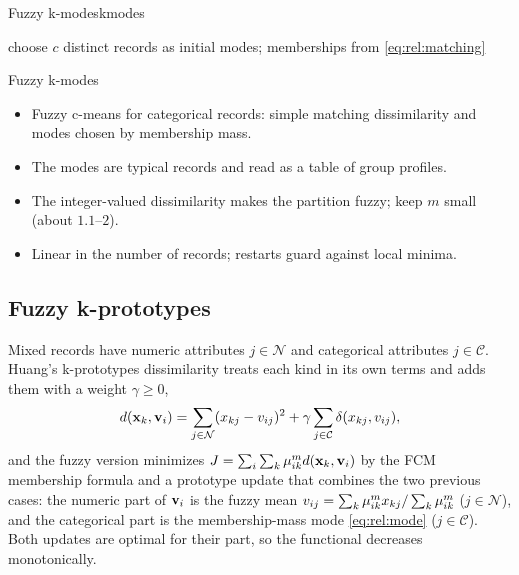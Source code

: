 \begin{algobox}{Fuzzy k-modes}{kmodes}
\begin{algorithm}[H]
choose $c$ distinct records as initial modes; memberships from \eqref{eq:rel:matching}\;
\end{algorithm}
\end{algobox}
\begin{summarybox}{Fuzzy k-modes}
\begin{itemize}
  \item Fuzzy c-means for categorical records: simple matching dissimilarity and modes chosen by membership mass.
  \item The modes are typical records and read as a table of group profiles.
  \item The integer-valued dissimilarity makes the partition fuzzy; keep $m$ small (about $1.1$--$2$).
  \item Linear in the number of records; restarts guard against local minima.
\end{itemize}
\end{summarybox}

\subsection{Fuzzy k-prototypes}\label{sec:rel:kprototypes}

Mixed records have numeric attributes $j\in\mathcal{N}$ and categorical attributes $j\in\mathcal{C}$. Huang's k-prototypes dissimilarity \cite{huang:1998:kprototypes} treats each kind in its own terms and adds them with a weight $\gamma\ge0$,
\begin{equation}
  d(\mathbf{x}_k,\mathbf{v}_i)=\sum_{j\in\mathcal{N}}(x_{kj}-v_{ij})^2+\gamma\sum_{j\in\mathcal{C}}\delta(x_{kj},v_{ij}),
  \label{eq:rel:kproto}
\end{equation}
and the fuzzy version minimizes $J=\sum_i\sum_k\mu_{ik}^m d(\mathbf{x}_k,\mathbf{v}_i)$ by the FCM membership formula and a prototype update that combines the two previous cases: the numeric part of $\mathbf{v}_i$ is the fuzzy mean $v_{ij}=\sum_k\mu_{ik}^m x_{kj}/\sum_k\mu_{ik}^m$ ($j\in\mathcal{N}$), and the categorical part is the membership-mass mode \eqref{eq:rel:mode} ($j\in\mathcal{C}$). Both updates are optimal for their part, so the functional decreases monotonically.

